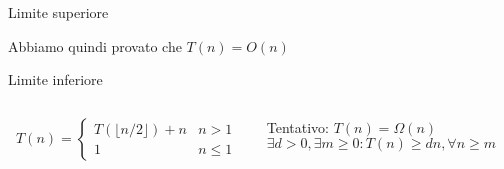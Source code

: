 \begin{frame}[shrink=5]{Limite superiore}
\begin{overprint}
\begin{mybox}
	Abbiamo quindi provato che $T(n)=O(n)$
\end{mybox}

\end{overprint}


\end{frame}


\begin{frame}[shrink=5]{Limite inferiore}


\vspace{-6pt}{}
\begin{mybox}
\begin{columns}[c]
\begin{column}{0.46\textwidth}
\[
T(n) = \begin{cases}
      T( \lfloor n/2 \rfloor )  + n & n > 1 \\
     1 & n \leq 1
  \end{cases}
\]
\end{column}
\begin{column}{0.51\textwidth}
\alert{Tentativo: $T(n) = \Omega(n)$}\\[2pt]
$\exists d > 0, \exists m \geq 0:T(n) \geq dn, \forall n \geq m$
\end{column}
\end{columns}
\end{mybox}




\end{frame}
